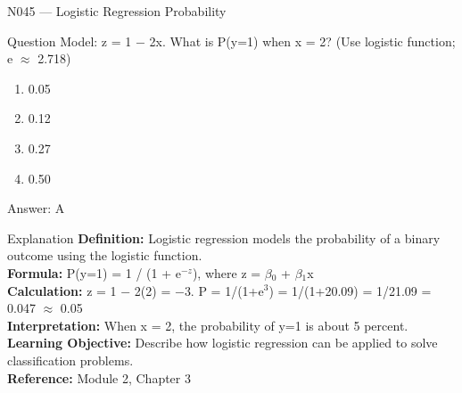 \documentclass[aspectratio=169,8pt]{beamer}
\begin{document}
	\begin{frame}{N045 --- Logistic Regression Probability}
		\begin{block}{Question}
			Model: z = 1 $-$ 2x. What is P(y=1) when x = 2? (Use logistic function; e $\approx$ 2.718)
			\begin{enumerate}
				\item 0.05
				\item 0.12
				\item 0.27
				\item 0.50
			\end{enumerate}
		\end{block}
		\begin{exampleblock}{Answer: A}\end{exampleblock}
		\begin{block}{Explanation}
			\textbf{Definition:} Logistic regression models the probability of a binary outcome using the logistic function.\\
			\textbf{Formula:} P(y=1) = 1 / (1 + e$^{-z}$), where z = $\beta$$_{0}$ + $\beta$$_{1}$x\\
			\textbf{Calculation:} z = 1 $-$ 2(2) = $-$3. P = 1/(1+e$^{3}$) = 1/(1+20.09) = 1/21.09 = 0.047 $\approx$ 0.05\\
			\textbf{Interpretation:} When x = 2, the probability of y=1 is about 5 percent.\\
			\textbf{Learning Objective:} Describe how logistic regression can be applied to solve classification problems.\\
			\textbf{Reference:} Module 2, Chapter 3
		\end{block}
	\end{frame}
	
\end{document}
